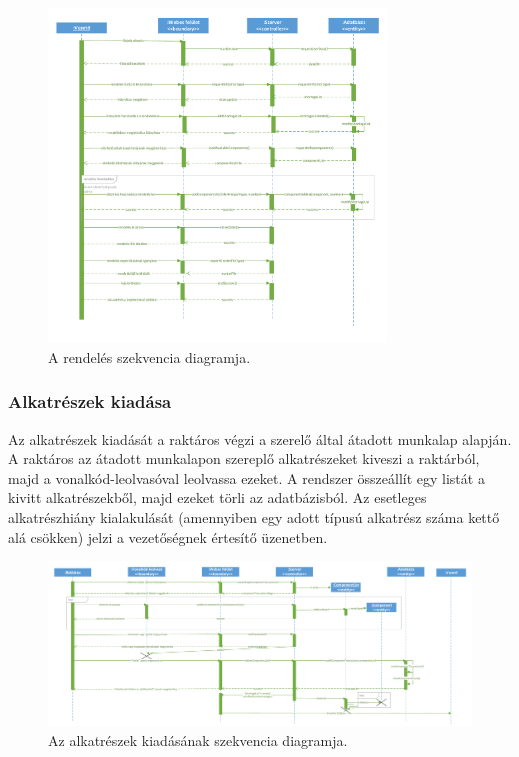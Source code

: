 \documentclass[12pt]{article}\usepackage[left=20mm,right=20mm,top=14mm,bottom=20mm]{geometry}
\begin{document}
\begin{figure}[!h]
    \centering
        \includegraphics[width=0.8\textwidth]{kepek/Rendeles_szekvencia.pdf}
        \caption{A rendelés szekvencia diagramja.}
\end{figure}

\thispagestyle{empty}
\begin{landscape}
\subsubsection{Alkatrészek kiadása}
Az alkatrészek kiadását a raktáros végzi a szerelő által átadott munkalap alapján. 
A raktáros az átadott munkalapon szereplő alkatrészeket kiveszi a raktárból, majd a vonalkód-leolvasóval leolvassa ezeket. 
A rendszer összeállít egy listát a kivitt alkatrészekből, majd ezeket törli az adatbázisból.
Az esetleges alkatrészhiány kialakulását (amennyiben egy adott típusú alkatrész száma kettő alá csökken) jelzi a vezetőségnek értesítő üzenetben. 

\begin{figure}[!h]
    \centering
        \includegraphics[width=1.4\textwidth]{kepek/kiadas_szekvencia.pdf}
        \caption{Az alkatrészek kiadásának szekvencia diagramja.}
\end{figure}
\end{landscape}
\end{document}
